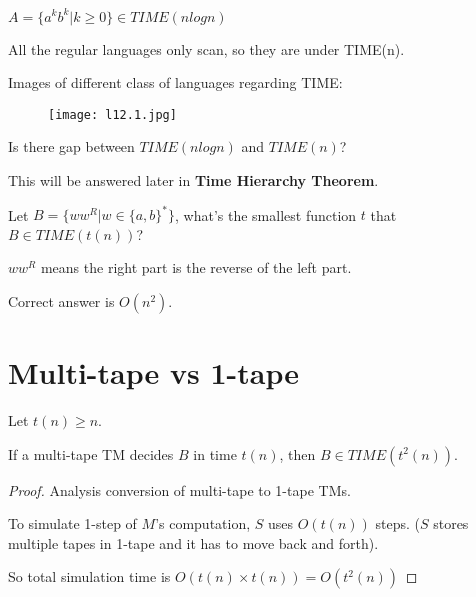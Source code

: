 \begin{example}
    \(A = \{ a^kb^k | k \geq 0 \}\in TIME(n log n)\) 

    \begin{remark}
        All the regular languages only scan, so they are under TIME(n).
    \end{remark}

    Images of different class of languages regarding TIME:

    \begin{figure}[H]
        \texttt{[image: l12.1.jpg]} 
    \end{figure}

\end{example}

\begin{note}
    Is there gap between \(TIME(n log n)\)  and \(TIME(n)\)? 

    This will be answered later in \textbf{Time Hierarchy Theorem}.  
\end{note}
\begin{problem}
    Let \(B = \{ww^R | w \in \{a, b  \}^*  \} \), what's the smallest function \(t\) that \(B \in TIME(t(n))\)?
    
    \begin{remark}
        \(ww^R\) means the right part is the reverse of the left part.
    \end{remark}

    Correct answer is \(O(n^2)\). 
\end{problem}

\section{Multi-tape vs 1-tape}
\begin{theorem}
    Let \(t(n) \geq n\).

    If a multi-tape TM decides \(B\) in time \(t(n)\), then \(B \in TIME(t^2(n))\).   
\end{theorem}
\begin{proof}
    Analysis conversion of multi-tape to 1-tape TMs.

    To simulate 1-step of \(M\)'s computation, \(S\) uses \(O(t(n))\) steps. 
    (\(S\)  stores multiple tapes in 1-tape and it has to move back and forth).

    So total simulation time is \(O(t(n) \times t(n)) = O(t^2(n))\) 
\end{proof}

